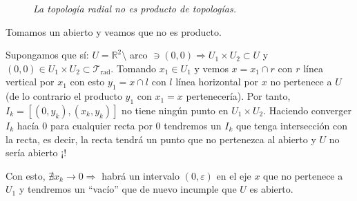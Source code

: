 \begin{ej}
\begin{figure}[H]
    \centering
    \caption{\textit{La topología radial no es producto de topologías.}}
\end{figure}
\begin{demo}
    Tomamos un abierto y veamos que no es producto. 

    Supongamos que sí:
    $U = \mathbb{R}^2 \setminus $ arco $\ni \left( 0, 0 \right) \Rightarrow U_1 \times U_2 \subset U$ y $\left( 0, 0 \right) \in U_1 \times U_2 \subset \mathcal{T}_{\text{rad}}$. Tomando $x_1 \in U_1$ y vemos $x = x_1 \cap r$ con $r$ línea vertical por $x_1$ con esto $y_1 = x \cap l$ con $l$ línea horizontal por $x$ no pertenece a $U$ (de lo contrario el producto $y_1$ con $x_1 = x$ pertenecería). Por tanto, $I_k = \left[ \left( 0, y_k \right), \left( x_k, y_k \right) \right]$ no tiene ningún punto en $U_1 \times U_2$. Haciendo converger $I_k$ hacía $0$ para cualquier recta por $0$ tendremos un $I_k$ que tenga intersección con la recta, es decir, la recta tendrá un punto que no pertenezca al abierto y $U$ no sería abierto ¡!

    Con esto, $\nexists x_k \rightarrow 0 \Rightarrow$ habrá un intervalo $\left( 0, \varepsilon \right)$ en el eje $x$ que no pertenece a $U_1$ y tendremos un ``vacío'' que de nuevo incumple que $U$ es abierto.
\end{demo}
\end{ej}

